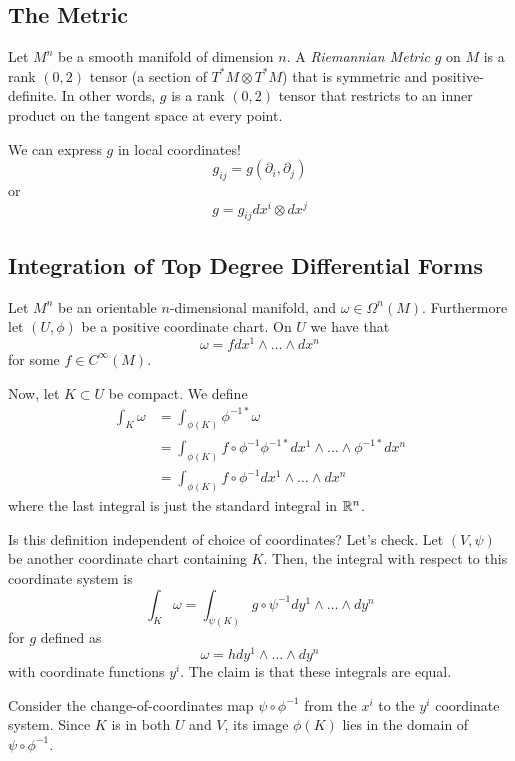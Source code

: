 \documentclass[../main.tex]{subfiles}
\begin{document}
\subsection{The Metric}

\begin{defn}
    Let $M^n$ be a smooth manifold of dimension $n$. A {\em Riemannian Metric}
    $g$ on $M$ is a rank $(0,2)$ tensor (a section of $T^*M\otimes T^*M$) that
    is symmetric and positive-definite. In other words, $g$ is a rank $(0,2)$
    tensor that restricts to an inner product on the tangent space at every
    point.
\end{defn}

We can express $g$ in local coordinates!
\[
    g_{ij} = g(\partial_i,\partial_j)
\]
or
\[
    g = g_{ij}dx^i\otimes dx^j
\]

\subsection{Integration of Top Degree Differential Forms}
Let $M^n$ be an orientable $n$-dimensional manifold, and $\omega\in
\Omega^n(M)$. Furthermore let $(U,\phi)$ be a positive coordinate chart. On $U$
we have that
\[
    \omega = fdx^1\wedge\ldots\wedge dx^n
\]
for some $f\in C^{\infty}(M)$.

Now, let $K\subset U$ be compact. We define
\[
    \begin{aligned}
        \int_K\omega &= \int_{\phi(K)}\phi^{-1*}\omega\\
                    &= \int_{\phi(K)}f\circ\phi^{-1}
                    \phi^{-1*}dx^1\wedge\ldots\wedge\phi^{-1*}dx^n\\
                    &=\int_{\phi(K)}f\circ\phi^{-1}dx^1\wedge\ldots\wedge dx^n
    \end{aligned}
\]
where the last integral is just the standard integral in $\mathbb{R}^n$.

Is this definition independent of choice of coordinates? Let's check.
Let $(V,\psi)$ be another coordinate chart containing $K$. Then, the integral
with respect to this coordinate system is
\[
    \int_K\omega = \int_{\psi(K)}g\circ\psi^{-1}dy^1\wedge\ldots\wedge dy^n
\]
for $g$ defined as
\[
    \omega = hdy^1\wedge\ldots\wedge dy^n
\]
with coordinate functions $y^i$. The claim is that these integrals are equal.

Consider the change-of-coordinates map $\psi\circ\phi^{-1}$ from the $x^i$ to
the $y^i$ coordinate system. Since $K$ is in both $U$ and $V$, its image
$\phi(K)$ lies in the domain of $\psi\circ\phi^{-1}$.
\end{document}

